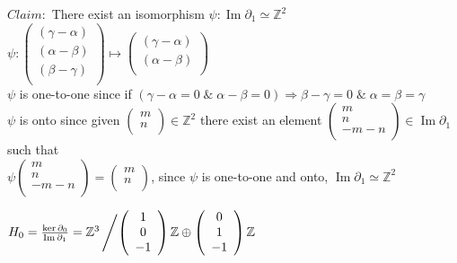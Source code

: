 \documentclass[11pt,a4paper]{report}
\DeclareMathOperator{\Ima}{Im}
\begin{document}
$Claim: $ There exist an isomorphism $\psi: \Ima\partial_1 \simeq \mathbb{Z}^2$\\
$\psi: \left(\begin{array}{c}
                    ( \gamma - \alpha )\\
                    (\alpha - \beta)\\
                    (\beta - \gamma)\\
            \end{array} \right) \mapsto
            \left(\begin{array}{c}
                    ( \gamma - \alpha )\\
                    (\alpha - \beta)\\
            \end{array} \right)$ \\
$\psi $ is one-to-one since if $ ( \gamma - \alpha  = 0 \; \& \; \alpha - \beta = 0) \Rightarrow \beta - \gamma = 0  \; \& \; \alpha = \beta = \gamma $ \\
$\psi $ is onto since given $\left(\begin{array}{c}
                    m\\
                    n\\
            \end{array} \right) \in \mathbb{Z}^2$
        there exist an element $\left(\begin{array}{c}
                    m\\
                    n\\
                    -m-n\\
            \end{array} \right) \in \Ima\partial_1 $ such that \\
$\psi \left(\begin{array}{c}
                    m\\
                    n\\
                    -m-n\\
            \end{array} \right) =
      \left(\begin{array}{c}
                    m\\
                    n\\
            \end{array} \right)$, since $\psi$ is one-to-one and onto, $\Ima\partial_1 \simeq \mathbb{Z}^2$

$H_0 = \frac{\ker\partial_0}{\Ima\partial_1} = \mathbb{Z}^{3} \left/ {
    \left(\begin{array}{c}
                    1\\
                    0\\
                    -1\\
            \end{array} \right)\mathbb{Z} \oplus
    \left(\begin{array}{c}
                    0\\
                    1\\
                    -1\\
            \end{array} \right)\mathbb{Z}} \right.$ \\
\end{document}
